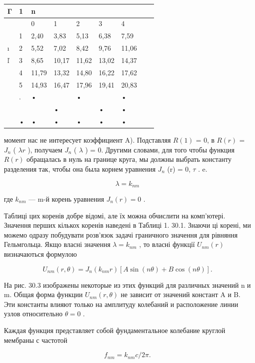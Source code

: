 \documentclass[
  ukrainian,
]{article}
\newcounter{none} %
\begin{document}
{\def\LTcaptype{none} %
\begin{longtable}[]{@{}lllllllll@{}}
\toprule\noalign{}
Γ & 1 & n & & & & & & \\
\midrule\noalign{}
\endhead
\bottomrule\noalign{}
\endlastfoot
& & 0 & 1 & 2 & 3 & 4 & & \\
& 1 & 2,40 & 3,83 & 5,13 & 6,38 & 7,59 & & \\
ı & 2 & 5,52 & 7,02 & 8,42 & 9,76 & 11,06 & & \\
ľ & 3 & 8,65 & 10,17 & 11,62 & 13,02 & 14,37 & & \\
& 4 & 11,79 & 13,32 & 14,80 & 16,22 & 17,62 & & \\
& 5 & 14,93 & 16,47 & 17,96 & 19,41 & 20,83 & & \\
& . & • & & • & & • & & \\
& & & • & & • & • & & \\
& • & • & • & • & • & • & & \\
\end{longtable}
}

момент нас не интересует коэффициент A). Подставляя \(R (1)\) = 0, в
\(R (r)\) = \(J_n\) ( \(\lambda r\) ), получаем \(J_n\) ( \(\lambda\) )
= 0. Другими словами, для того чтобы функция \(R (r)\) обращалась в нуль
на границе круга, мы должны выбрать константу разделения так, чтобы она
была корнем уравнения \(J_n\) (r) = 0, \(\tau\) . e.

\[
\lambda = k_{nm}
\]

где \(k_{nm}\) --- m-й корень уравнения \(J_n(r) = 0\) .

Таблиці цих коренів добре відомі, але їх можна обчислити на комп'ютері.
Значення перших кількох коренів наведені в Таблиці 1. 30.1. Знаючи ці
корені, ми можемо одразу побудувати розв'язок задачі граничного значення
для рівняння Гельмгольца. Якщо власні значення \(\lambda = k_{nm}\) , то
власні функції \(U_{ nm}(r)\) визначаються формулою

\[
U_{nm}(r, \theta) = J_n(k_{nm}r) [A \sin(n\theta) + B \cos(n\theta)].
\]

На рис. 30.3 изображены некоторые из этих функций для различных значений
n и m. Общая форма функции \(U_{nm}(r,\theta)\) не зависит от значений
констант A и B. Эти константы влияют только на амплитуду колебаний и
расположение линии узлов относительно \(\theta=0\) .

Каждая функция представляет собой фундаментальное колебание круглой
мембраны с частотой

\[
f_{nm} = k_{nm}c/2\pi.
\]
\end{document}
